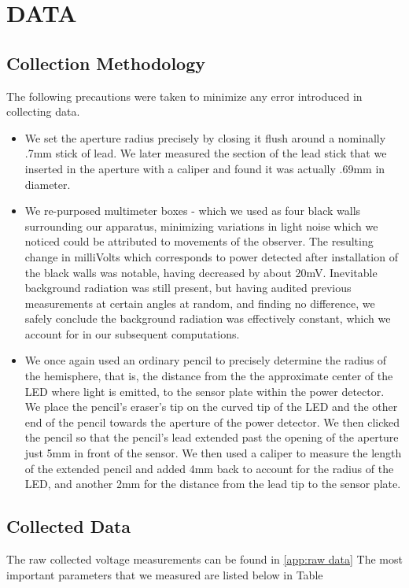 \section{DATA}
\subsection{Collection Methodology}
The following precautions were taken to minimize any error introduced in collecting data.

\begin{itemize}
    \item We set the aperture radius precisely by closing it flush around a nominally .7mm stick of lead. We later measured the section of the lead stick that we inserted in the aperture with a caliper and found it was actually .69mm in diameter.
    \item We re-purposed multimeter boxes - which we used as four black walls surrounding our apparatus, minimizing variations in light noise which we noticed could be attributed to movements of the observer. The resulting change in milliVolts which corresponds to power detected after installation of the black walls was notable, having decreased by about 20mV. Inevitable background radiation was still present, but having audited previous measurements at certain angles at random, and finding no difference, we safely conclude the background radiation was effectively constant, which we account for in our subsequent computations.
    \item We once again used an ordinary pencil to precisely determine the radius of the hemisphere, that is, the distance from the the approximate center of the LED where light is emitted, to the sensor plate within the power detector. We place the pencil's eraser's tip on the curved tip of the LED and the other end of the pencil towards the aperture of the power detector. We then clicked the pencil so that the pencil's lead extended past the opening of the aperture just 5mm in front of the sensor. We then used a caliper to measure the length of the extended pencil and added 4mm back to account for the radius of the LED, and another 2mm for the distance from the lead tip to the sensor plate.
\end{itemize}

\newpage
\subsection{Collected Data}
The raw collected voltage measurements can be found in \autoref{app:raw data} The most important parameters that we measured are listed below in Table %

